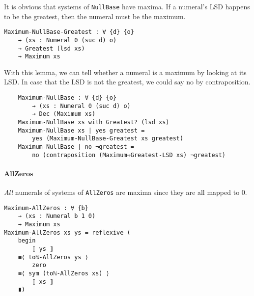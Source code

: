 \documentclass[\main/thesis.tex]{subfiles}
\begin{document}
It is obvious that systems of {\lstinline|NullBase|} have maxima.
If a numeral's LSD happens to be the greatest,
then the numeral must be the maximum.

\begin{lstlisting}
Maximum-NullBase-Greatest : ∀ {d} {o}
    → (xs : Numeral 0 (suc d) o)
    → Greatest (lsd xs)
    → Maximum xs
\end{lstlisting}

With this lemma, we can tell whether a numeral is a maximum by looking at its
LSD. In case that the LSD is not the greatest, we could say no by contraposition.

\begin{lstlisting}
    Maximum-NullBase : ∀ {d} {o}
        → (xs : Numeral 0 (suc d) o)
        → Dec (Maximum xs)
    Maximum-NullBase xs with Greatest? (lsd xs)
    Maximum-NullBase xs | yes greatest =
        yes (Maximum-NullBase-Greatest xs greatest)
    Maximum-NullBase | no ¬greatest =
        no (contraposition (Maximum⇒Greatest-LSD xs) ¬greatest)
\end{lstlisting}

\paragraph{AllZeros}

\begin{center}
    \begin{adjustbox}{max width=\textwidth}
    \end{adjustbox}
\end{center}

\textit{All} numerals of systems of {\lstinline|AllZeros|} are maxima
since they are all mapped to $ 0 $.

\begin{lstlisting}
Maximum-AllZeros : ∀ {b}
    → (xs : Numeral b 1 0)
    → Maximum xs
Maximum-AllZeros xs ys = reflexive (
    begin
        ⟦ ys ⟧
    ≡⟨ toℕ-AllZeros ys ⟩
        zero
    ≡⟨ sym (toℕ-AllZeros xs) ⟩
        ⟦ xs ⟧
    ∎)
\end{lstlisting}
\end{document}
